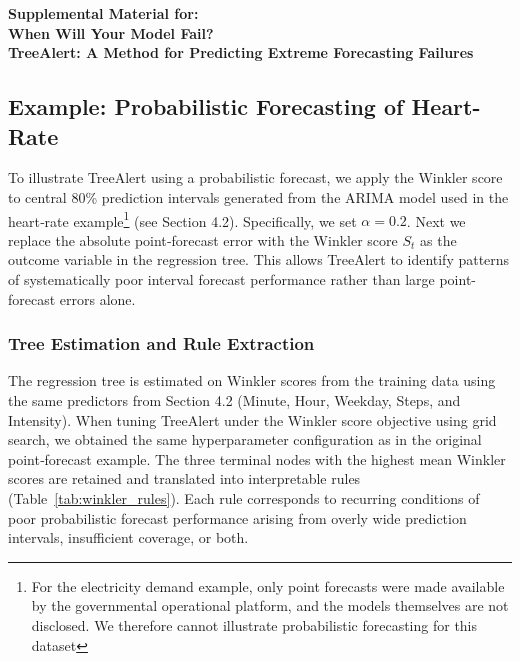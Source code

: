 \documentclass[12pt]{article}
\begin{document}
\clearpage
\bigskip
\begin{center}
{\LARGE \bf Supplemental Material for: \\ When Will Your Model Fail?\\TreeAlert: A Method for Predicting Extreme Forecasting Failures}
\end{center}
\FloatBarrier
\subsection{Example: Probabilistic Forecasting of Heart-Rate}
\label{app:probabilistic_treealert}

To illustrate TreeAlert using a probabilistic forecast, we apply the Winkler score to central 80\% prediction intervals generated from the ARIMA model used in the heart‑rate example\footnote{For the electricity demand example, only point forecasts were made available %
by the governmental operational platform, and the models themselves are not disclosed. We therefore cannot illustrate probabilistic forecasting for this dataset}%
 (see Section 4.2). Specifically, we set %
$\alpha=0.2$. Next we replace the absolute point‑forecast error with the Winkler score $S_t$ as the outcome variable in the regression tree. This allows TreeAlert to identify patterns of systematically poor interval forecast performance rather than large point-forecast errors alone. 

\FloatBarrier
\subsubsection*{Tree Estimation and Rule Extraction}
The regression tree is estimated on Winkler scores from the training data using the same predictors from Section 4.2 (Minute, Hour, Weekday, Steps, and Intensity). When tuning TreeAlert under the Winkler score objective using grid search, we obtained the same hyperparameter configuration as in the original point‑forecast %
example. The three terminal nodes with the highest mean Winkler scores are retained and translated into interpretable rules (Table~\ref{tab:winkler_rules}). Each rule corresponds to recurring conditions of poor probabilistic forecast performance arising from overly wide prediction intervals, insufficient coverage, or both.
\end{document}
